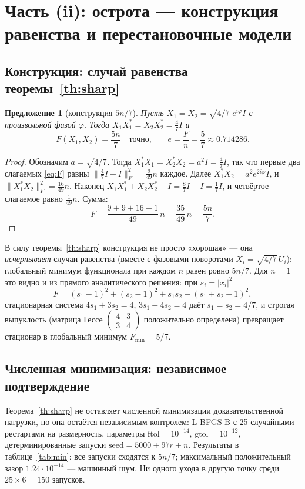 \documentclass[11pt,a4paper]{article}
\theoremstyle{plain}
\newtheorem{proposition}[theorem]{Предложение}
\theoremstyle{definition}
\theoremstyle{remark}
\begin{document}
\section{Часть (ii): острота — конструкция равенства и перестановочные модели}
\label{sec:part2}

\subsection{Конструкция: случай равенства теоремы~\ref{th:sharp}}

\begin{proposition}[конструкция $5n/7$]\label{prop:construct}
Пусть $X_1=X_2=\sqrt{4/7}\;e^{i\varphi}I$ с произвольной фазой
$\varphi$. Тогда $X_1X_1^*=X_2X_2^*=\frac47I$ и
\[
F(X_1,X_2)=\frac{5n}{7}\quad\text{точно,}
\qquad e=\frac{F}{n}=\frac{5}{7}\approx 0.714286.
\]
\end{proposition}

\begin{proof}
Обозначим $a=\sqrt{4/7}$. Тогда $X_1^*X_1=X_2^*X_2=a^2I=\frac47 I$, так
что первые два слагаемых \eqref{eq:F} равны
$\|\frac47I-I\|_F^2=\frac{9}{49}n$ каждое. Далее
$X_1^*X_2=a^2e^{2i\varphi}I$, и
$\|X_1^*X_2\|_F^2=\frac{16}{49}n$. Наконец
$X_1X_1^*+X_2X_2^*-I=\frac87I-I=\frac17I$, и четвёртое слагаемое равно
$\frac1{49}n$. Сумма:
\[
F=\frac{9+9+16+1}{49}\,n=\frac{35}{49}\,n=\frac{5n}{7}.
\]
\end{proof}

В силу теоремы~\ref{th:sharp} конструкция не просто «хорошая» — она
\emph{исчерпывает} случаи равенства (вместе с фазовыми поворотами
$X_i=\sqrt{4/7}\,U_i$): глобальный минимум функционала при каждом $n$
равен ровно $5n/7$. Для $n=1$ это видно и из прямого аналитического
решения: при $s_i=|x_i|^2$
\[
F=(s_1-1)^2+(s_2-1)^2+s_1s_2+(s_1+s_2-1)^2,
\]
стационарная система $4s_1+3s_2=4$, $3s_1+4s_2=4$ даёт $s_1=s_2=4/7$,
и строгая выпуклость (матрица Гессе
$\left(\begin{smallmatrix}4&3\\3&4\end{smallmatrix}\right)$ положительно
определена) превращает стационар в глобальный минимум $F_{\min}=5/7$.

\subsection{Численная минимизация: независимое подтверждение}

Теорема~\ref{th:sharp} не оставляет численной минимизации
доказательственной нагрузки, но она остаётся независимым контролем:
L-BFGS-B с 25 случайными рестартами на размерность, параметры
$\mathrm{ftol}=10^{-14}$, $\mathrm{gtol}=10^{-12}$, детерминированные
запуски $\mathrm{seed}=5000+97r+n$. Результаты в таблице~\ref{tab:min}:
все запуски сходятся к $5n/7$; максимальный положительный зазор
$1.24\cdot 10^{-14}$ — машинный шум. Ни одного ухода в другую точку
среди $25\times 6=150$ запусков.
\end{document}
